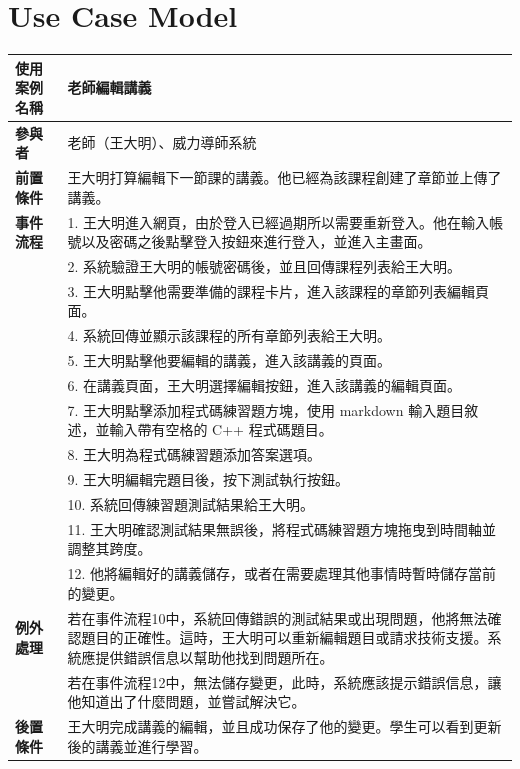\documentclass[12pt]{article}
\begin{document}
\newpage
\section{Use Case Model}

\begin{longtable}{|l|p{14cm}|}
  \hline
  \textbf{使用案例名稱} & 老師編輯講義 \\ 
  \hline
  \textbf{參與者} & 老師（王大明）、威力導師系統 \\ 
  \hline
  \textbf{前置條件} & 王大明打算編輯下一節課的講義。他已經為該課程創建了章節並上傳了講義。\\ 
  \hline
  \textbf{事件流程} 
  & 1. 王大明進入網頁，由於登入已經過期所以需要重新登入。他在輸入帳號以及密碼之後點擊登入按鈕來進行登入，並進入主畫面。 \\
  & 2. 系統驗證王大明的帳號密碼後，並且回傳課程列表給王大明。 \\
  & 3. 王大明點擊他需要準備的課程卡片，進入該課程的章節列表編輯頁面。 \\
  & 4. 系統回傳並顯示該課程的所有章節列表給王大明。 \\
  & 5. 王大明點擊他要編輯的講義，進入該講義的頁面。 \\
  & 6. 在講義頁面，王大明選擇編輯按鈕，進入該講義的編輯頁面。 \\
  & 7. 王大明點擊添加程式碼練習題方塊，使用 markdown 輸入題目敘述，並輸入帶有空格的 C++ 程式碼題目。 \\
  & 8. 王大明為程式碼練習題添加答案選項。 \\
  & 9. 王大明編輯完題目後，按下測試執行按鈕。 \\
  & 10. 系統回傳練習題測試結果給王大明。 \\
  & 11. 王大明確認測試結果無誤後，將程式碼練習題方塊拖曳到時間軸並調整其跨度。 \\ 
  & 12. 他將編輯好的講義儲存，或者在需要處理其他事情時暫時儲存當前的變更。 \\
  \hline
  \textbf{例外處理} 
  & 若在事件流程10中，系統回傳錯誤的測試結果或出現問題，他將無法確認題目的正確性。這時，王大明可以重新編輯題目或請求技術支援。系統應提供錯誤信息以幫助他找到問題所在。 \\
  & 若在事件流程12中，無法儲存變更，此時，系統應該提示錯誤信息，讓他知道出了什麼問題，並嘗試解決它。 \\
  \hline
  \textbf{後置條件} & 王大明完成講義的編輯，並且成功保存了他的變更。學生可以看到更新後的講義並進行學習。 \\
  \hline
\end{longtable}
\end{document}
